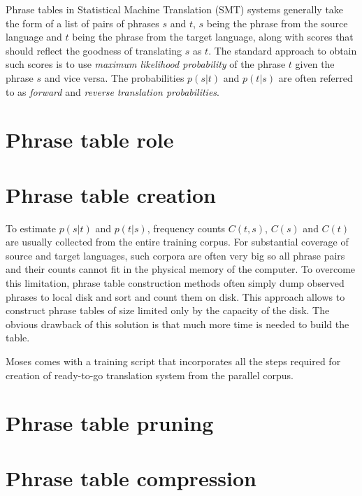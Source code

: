 
Phrase tables in Statistical Machine Translation (SMT) systems generally take
the form of a list of pairs of phrases $s$ and $t$, $s$ being the phrase from
the source language and $t$ being the phrase from the target language, along
with scores that should reflect the goodness of translating $s$ as $t$.
The standard approach to obtain such scores is to use \emph{maximum likelihood
probability} of the phrase $t$ given the phrase $s$ and vice versa.
The probabilities $p(s|t)$ and $p(t|s)$ are often referred to as
\emph{forward} and \emph{reverse} \emph{translation probabilities}.


\section{Phrase table role}



\section{Phrase table creation}

To estimate $p(s|t)$ and $p(t|s)$, frequency counts $C(t,s)$, $C(s)$ and
$C(t)$ are usually collected from the entire training corpus.
For substantial coverage of source and target languages, such corpora are
often very big so all phrase pairs and their counts cannot fit in the
physical memory of the computer.
To overcome this limitation, phrase table construction methods often simply
dump observed phrases to local disk and sort and count them on disk.
This approach allows to construct phrase tables of size limited only by the
capacity of the disk.
The obvious drawback of this solution is that much more time is needed
to build the table.



Moses comes with a training script that incorporates all the steps required
for creation of ready-to-go translation system from the parallel corpus.

\section{Phrase table pruning}


\section{Phrase table compression}

